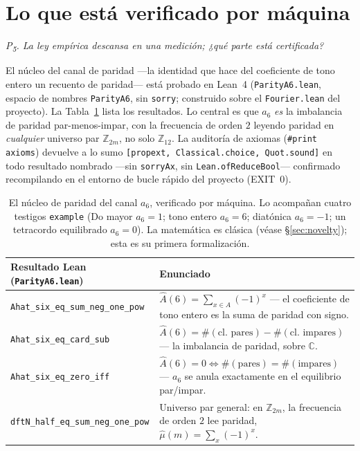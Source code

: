 \documentclass[11pt]{article}
\newcommand{\lean}[1]{\texttt{#1}}
\newcommand{\Ztwelve}{\mathbb{Z}_{12}}
\newcommand{\Zn}[1]{\mathbb{Z}_{#1}}
\newcommand{\Ahat}{\hat{A}}
\newcommand{\question}[1]{\smallskip\noindent\textit{#1}\smallskip}
\begin{document}
\section{Lo que está verificado por máquina}\label{sec:checked}

\question{P\textsubscript{5}. La ley empírica descansa en una medición; ¿qué parte está certificada?}

El núcleo del canal de paridad ---la identidad que hace del coeficiente de tono entero un recuento de
paridad--- está probado en Lean~4 (\lean{ParityA6.lean}, espacio de nombres \lean{ParityA6}, sin
\lean{sorry}; construido sobre el \lean{Fourier.lean} del proyecto). La Tabla~\ref{tab:lean} lista los
resultados. Lo central es que $a_6$ \emph{es} la imbalancia de paridad par-menos-impar, con la frecuencia
de orden $2$ leyendo paridad en \emph{cualquier} universo par $\Zn{2m}$, no solo $\Ztwelve$. La auditoría de
axiomas (\lean{\#print axioms}) devuelve a lo sumo \lean{[propext, Classical.choice, Quot.sound]} en todo
resultado nombrado ---sin \lean{sorryAx}, sin \lean{Lean.ofReduceBool}--- confirmado recompilando en el
entorno de bucle rápido del proyecto (EXIT~0).

\begin{table}[H]
\centering\small
{}
\begin{tabular}{@{}l p{}@{}}
\toprule
\rowcolor{ctA!22}
\textbf{Resultado Lean (\lean{ParityA6.lean})} & \textbf{Enunciado}\\
\midrule
\lean{Ahat\_six\_eq\_sum\_neg\_one\_pow} & $\Ahat(6)=\sum_{x\in A}(-1)^{x}$ --- el coeficiente de tono entero es la suma de paridad con signo.\\
\lean{Ahat\_six\_eq\_card\_sub} & $\Ahat(6)=\#(\text{cl.\ pares})-\#(\text{cl.\ impares})$ --- la imbalancia de paridad, sobre $\mathbb{C}$.\\
\lean{Ahat\_six\_eq\_zero\_iff} & $\Ahat(6)=0\iff \#(\text{pares})=\#(\text{impares})$ --- $a_6$ se anula exactamente en el equilibrio par/impar.\\
\lean{dftN\_half\_eq\_sum\_neg\_one\_pow} & Universo par general: en $\Zn{2m}$, la frecuencia de orden $2$ lee paridad, $\hat\mu(m)=\sum_x(-1)^{x}$.\\
\bottomrule
\end{tabular}
\caption{El núcleo de paridad del canal $a_6$, verificado por máquina. Lo acompañan cuatro testigos
\lean{example} (Do mayor $a_6=1$; tono entero $a_6=6$; diatónica $a_6=-1$; un tetracordo equilibrado
$a_6=0$). La matemática es clásica (véase \S\ref{sec:novelty}); esta es su primera formalización.}
\label{tab:lean}
\end{table}
\end{document}
